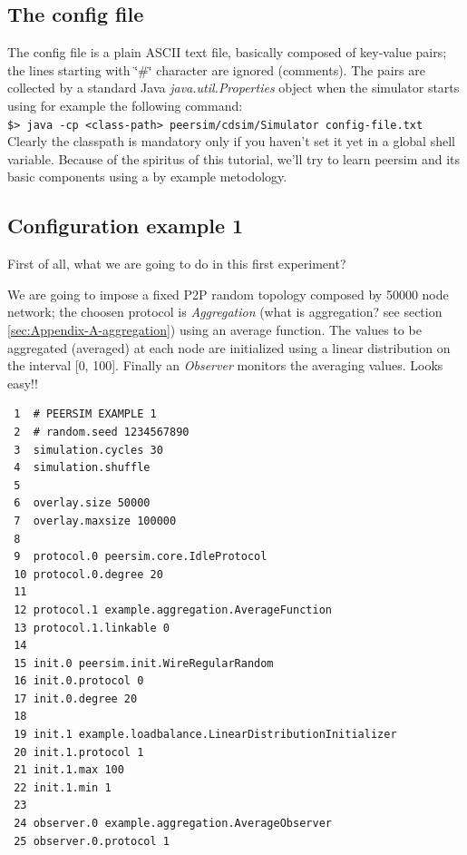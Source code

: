 \documentclass[a4paper,11pt]{article}
\begin{document}
\subsection{The config file}
\label{configfile}

The config file is a plain ASCII text file, basically composed of
key-value pairs; the lines starting with \char`\"{}\#\char`\"{} character
are ignored (comments). The pairs are collected by a standard Java
\emph{java.util.Properties} object when the simulator starts using
for example the following command:\\


\texttt{\footnotesize \$> java -cp <class-path> peersim/cdsim/Simulator
config-file.txt}\\


Clearly the classpath is mandatory only if you haven't set it yet
in a global shell variable. Because of the spiritus of this tutorial,
we'll try to learn peersim and its basic components
using a by example metodology.


\subsection{Configuration example 1}

First of all, what we are going to do in this first experiment? 

We are going to impose a fixed P2P random topology composed by 50000
node network; the choosen protocol is \emph{Aggregation} (what is
aggregation? see section \ref{sec:Appendix-A-aggregation}) using
an average function. The values to be aggregated (averaged) at each
node are initialized using a linear distribution on the interval {[}0,
100{]}. Finally an \emph{Observer} monitors the averaging values.
Looks easy!!\\

\footnotesize
\begin{verbatim}
 1  # PEERSIM EXAMPLE 1
 2  # random.seed 1234567890
 3  simulation.cycles 30
 4  simulation.shuffle
 5 
 6  overlay.size 50000
 7  overlay.maxsize 100000
 8 
 9  protocol.0 peersim.core.IdleProtocol
 10 protocol.0.degree 20
 11
 12 protocol.1 example.aggregation.AverageFunction
 13 protocol.1.linkable 0
 14
 15 init.0 peersim.init.WireRegularRandom
 16 init.0.protocol 0
 17 init.0.degree 20
 18
 19 init.1 example.loadbalance.LinearDistributionInitializer
 20 init.1.protocol 1
 21 init.1.max 100
 22 init.1.min 1
 23
 24 observer.0 example.aggregation.AverageObserver
 25 observer.0.protocol 1
\end{verbatim}
\normalsize
\end{document}
